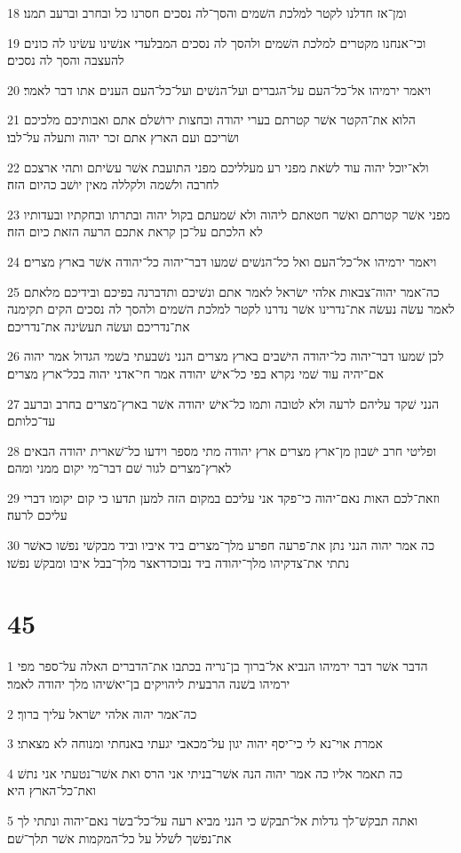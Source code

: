 \par 18 ומן־אז חדלנו לקטר למלכת השׁמים והסך־לה נסכים חסרנו כל ובחרב וברעב תמנו׃
\par 19 וכי־אנחנו מקטרים למלכת השׁמים ולהסך לה נסכים המבלעדי אנשׁינו עשׂינו לה כונים להעצבה והסך לה נסכים׃
\par 20 ויאמר ירמיהו אל־כל־העם על־הגברים ועל־הנשׁים ועל־כל־העם הענים אתו דבר לאמר׃
\par 21 הלוא את־הקטר אשׁר קטרתם בערי יהודה ובחצות ירושׁלם אתם ואבותיכם מלכיכם ושׂריכם ועם הארץ אתם זכר יהוה ותעלה על־לבו׃
\par 22 ולא־יוכל יהוה עוד לשׂאת מפני רע מעלליכם מפני התועבת אשׁר עשׂיתם ותהי ארצכם לחרבה ולשׁמה ולקללה מאין יושׁב כהיום הזה׃
\par 23 מפני אשׁר קטרתם ואשׁר חטאתם ליהוה ולא שׁמעתם בקול יהוה ובתרתו ובחקתיו ובעדותיו לא הלכתם על־כן קראת אתכם הרעה הזאת כיום הזה׃
\par 24 ויאמר ירמיהו אל־כל־העם ואל כל־הנשׁים שׁמעו דבר־יהוה כל־יהודה אשׁר בארץ מצרים׃
\par 25 כה־אמר יהוה־צבאות אלהי ישׂראל לאמר אתם ונשׁיכם ותדברנה בפיכם ובידיכם מלאתם לאמר עשׂה נעשׂה את־נדרינו אשׁר נדרנו לקטר למלכת השׁמים ולהסך לה נסכים הקים תקימנה את־נדריכם ועשׂה תעשׂינה את־נדריכם׃
\par 26 לכן שׁמעו דבר־יהוה כל־יהודה הישׁבים בארץ מצרים הנני נשׁבעתי בשׁמי הגדול אמר יהוה אם־יהיה עוד שׁמי נקרא בפי כל־אישׁ יהודה אמר חי־אדני יהוה בכל־ארץ מצרים׃
\par 27 הנני שׁקד עליהם לרעה ולא לטובה ותמו כל־אישׁ יהודה אשׁר בארץ־מצרים בחרב וברעב עד־כלותם׃
\par 28 ופליטי חרב ישׁבון מן־ארץ מצרים ארץ יהודה מתי מספר וידעו כל־שׁארית יהודה הבאים לארץ־מצרים לגור שׁם דבר־מי יקום ממני ומהם׃
\par 29 וזאת־לכם האות נאם־יהוה כי־פקד אני עליכם במקום הזה למען תדעו כי קום יקומו דברי עליכם לרעה׃
\par 30 כה אמר יהוה הנני נתן את־פרעה חפרע מלך־מצרים ביד איביו וביד מבקשׁי נפשׁו כאשׁר נתתי את־צדקיהו מלך־יהודה ביד נבוכדראצר מלך־בבל איבו ומבקשׁ נפשׁו׃

\chapter{45}

\par 1 הדבר אשׁר דבר ירמיהו הנביא אל־ברוך בן־נריה בכתבו את־הדברים האלה על־ספר מפי ירמיהו בשׁנה הרבעית ליהויקים בן־יאשׁיהו מלך יהודה לאמר׃
\par 2 כה־אמר יהוה אלהי ישׂראל עליך ברוך׃
\par 3 אמרת אוי־נא לי כי־יסף יהוה יגון על־מכאבי יגעתי באנחתי ומנוחה לא מצאתי׃
\par 4 כה תאמר אליו כה אמר יהוה הנה אשׁר־בניתי אני הרס ואת אשׁר־נטעתי אני נתשׁ ואת־כל־הארץ היא׃
\par 5 ואתה תבקשׁ־לך גדלות אל־תבקשׁ כי הנני מביא רעה על־כל־בשׂר נאם־יהוה ונתתי לך את־נפשׁך לשׁלל על כל־המקמות אשׁר תלך־שׁם׃

